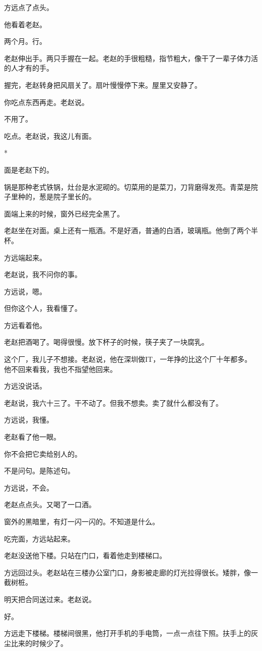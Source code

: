\documentclass[UTF8,a5paper,11pt,openany]{ctexbook}
\newcommand{\scene}{\vspace{1em}\begin{center}*\quad*\quad*\end{center}\vspace{0.5em}}
\begin{document}
方远点了点头。

他看着老赵。

两个月。行。

老赵伸出手。两只手握在一起。老赵的手很粗糙，指节粗大，像干了一辈子体力活的人才有的手。

握完，老赵转身把风扇关了。扇叶慢慢停下来。屋里又安静了。

你吃点东西再走。老赵说。

不用了。

吃点。老赵说，我这儿有面。


\scene

面是老赵下的。

锅是那种老式铁锅，灶台是水泥砌的。切菜用的是菜刀，刀背磨得发亮。青菜是院子里种的，葱是院子里长的。

面端上来的时候，窗外已经完全黑了。

老赵坐在对面。桌上还有一瓶酒。不是好酒，普通的白酒，玻璃瓶。他倒了两个半杯。

方远端起来。

老赵说，我不问你的事。

方远说，嗯。

但你这个人，我看懂了。

方远看着他。

老赵把酒喝了。喝得很慢。放下杯子的时候，筷子夹了一块腐乳。

这个厂，我儿子不想接。老赵说，他在深圳做IT，一年挣的比这个厂十年都多。他不回来看我，我也不指望他回来。

方远没说话。

老赵说，我六十三了。干不动了。但我不想卖。卖了就什么都没有了。

方远说，我懂。

老赵看了他一眼。

你不会把它卖给别人的。

不是问句。是陈述句。

方远说，不会。

老赵点点头。又喝了一口酒。

窗外的黑暗里，有灯一闪一闪的。不知道是什么。

吃完面，方远站起来。

老赵没送他下楼。只站在门口，看着他走到楼梯口。

方远回过头。老赵站在三楼办公室门口，身影被走廊的灯光拉得很长。矮胖，像一截树桩。

明天把合同送过来。老赵说。

好。

方远走下楼梯。楼梯间很黑，他打开手机的手电筒，一点一点往下照。扶手上的灰尘比来的时候少了。
\end{document}
